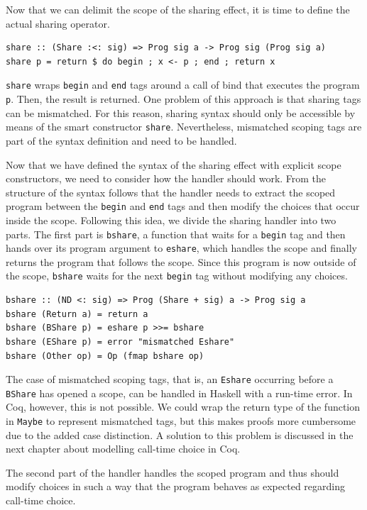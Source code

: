 \documentclass[a4paper, 11pt, fleqn, twoside]{scrreprt}
\newcommand{\hinl}[1]{\texttt{#1}}
\begin{document}
Now that we can delimit the scope of the sharing effect, it is time to define the actual sharing operator.


\begin{verbatim}
share :: (Share :<: sig) => Prog sig a -> Prog sig (Prog sig a)
share p = return $ do begin ; x <- p ; end ; return x
\end{verbatim}

\hinl{share} wraps \hinl{begin} and \hinl{end} tags around a call of bind that executes the program \hinl{p}.
Then, the result is returned.
One problem of this approach is that sharing tags can be mismatched.
For this reason, sharing syntax should only be accessible by means of the smart constructor \hinl{share}.
Nevertheless, mismatched scoping tags are part of the syntax definition and need to be handled.

Now that we have defined the syntax of the sharing effect with explicit scope constructors, we need to consider how the handler should work.
From the structure of the syntax follows that the handler needs to extract the scoped program between the \hinl{begin} and \hinl{end} tags and then modify the choices that occur inside the scope.
Following this idea, we divide the sharing handler into two parts.
The first part is \hinl{bshare}, a function that waits for a \hinl{begin} tag and then hands over its program argument to \hinl{eshare}, which handles the scope and finally returns the program that follows the scope.
Since this program is now outside of the scope, \hinl{bshare} waits for the next \hinl{begin} tag without modifying any choices.

\begin{verbatim}
bshare :: (ND <: sig) => Prog (Share + sig) a -> Prog sig a
bshare (Return a) = return a
bshare (BShare p) = eshare p >>= bshare
bshare (EShare p) = error "mismatched Eshare"
bshare (Other op) = Op (fmap bshare op)
\end{verbatim}

The case of mismatched scoping tags, that is, an \hinl{Eshare} occurring before a \hinl{BShare} has opened a scope, can be handled in Haskell with a run-time error.
In Coq, however, this is not possible.
We could wrap the return type of the function in \hinl{Maybe} to represent mismatched tags, but this makes proofs more cumbersome due to the added case distinction.
A solution to this problem is discussed in the next chapter about modelling call-time choice in Coq.

The second part of the handler handles the scoped program and thus should modify choices in such a way that the program behaves as expected regarding call-time choice.
\end{document}
